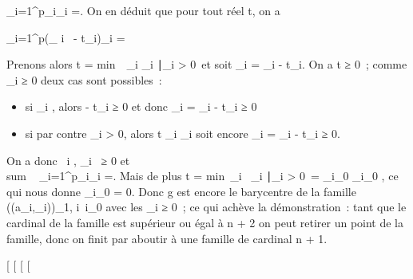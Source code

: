 \documentclass[]{article}
\begin{document}
_i=1^p\lambda_i\overrightarrowga_i
=. On en déduit que pour tout réel
t, on a

\sum _i=1^p(\lambda_ i~ -
t\alpha_i)\overrightarrowga_i
=

Prenons alors t = min~\
\lambda_i \over \alpha_i
∣\alpha_i >
0\ et soit \mu_i = \lambda_i - t\alpha_i.
On a t ≥ 0~; comme \lambda_i ≥ 0 deux cas sont possibles~:

\begin{itemize}
\itemsep1pt\parskip0pt
\item
  si \alpha_i , alors - t\alpha_i ≥ 0 et donc \mu_i =
  \lambda_i - t\alpha_i ≥ 0
\item
  si par contre \alpha_i > 0, alors t \leq \lambda_i
  \over \alpha_i soit encore \mu_i =
  \lambda_i - t\alpha_i ≥ 0.
\end{itemize}

On a donc \forall~i \in [1,p], \mu_i~ ≥ 0 et
\\sum ~
_i=1^p\mu_i\overrightarrowga_i
=. Mais de plus t
= min\ \lambda_i~
\over \alpha_i
∣\alpha_i >
0\ = \lambda_i_0 \over
\alpha_i_0 , ce qui nous donne \mu_i_0 =
0. Donc g est encore le barycentre de la famille \left
((a_i,\mu_i)\right )_1\leqi\leqp,
i\neq~i_0 avec les \mu_i ≥ 0~;
ce qui achève la démonstration~: tant que le cardinal de la famille est
supérieur ou égal à n + 2 on peut retirer un point de la famille, donc
on finit par aboutir à une famille de cardinal n + 1.

[
[
[
[
\end{document}
